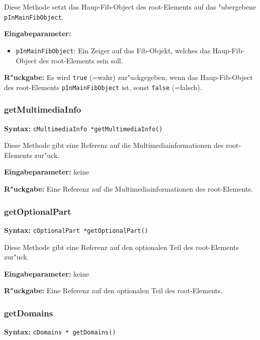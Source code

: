 \bigskip\noindent
Diese Methode setzt das Haup-Fib-Object des root-Elements auf das "ubergebene \verb|pInMainFibObject|.

\bigskip\noindent
\textbf{Eingabeparameter:}
\begin{itemize}
 \item \verb|pInMainFibObject|: Ein Zeiger auf das Fib-Objekt, welches das Haup-Fib-Object des root-Elements sein soll.
\end{itemize}

\bigskip\noindent
\textbf{R"uckgabe:} Es wird \verb|true| (=wahr) zur"uckgegeben, wenn das Haup-Fib-Object des root-Elements \verb|pInMainFibObject| ist, sonst \verb|false| (=falsch).


\subsubsection{getMultimediaInfo}

\textbf{Syntax:} \verb|cMultimediaInfo *getMultimediaInfo()|

\bigskip\noindent
Diese Methode gibt eine Referenz auf die Multimediainformationen des root-Ele\-men\-ts zur"uck.

\bigskip\noindent
\textbf{Eingabeparameter:} keine

\bigskip\noindent
\textbf{R"uckgabe:} Eine Referenz auf die Multimediainformationen des root-Elements.


\subsubsection{getOptionalPart}

\textbf{Syntax:} \verb|cOptionalPart *getOptionalPart()|

\bigskip\noindent
Diese Methode gibt eine Referenz auf den optionalen Teil des root-Elements zur"uck.

\bigskip\noindent
\textbf{Eingabeparameter:} keine

\bigskip\noindent
\textbf{R"uckgabe:} Eine Referenz auf den optionalen Teil des root-Elements.


\subsubsection{getDomains}

\textbf{Syntax:} \verb|cDomains * getDomains()|

